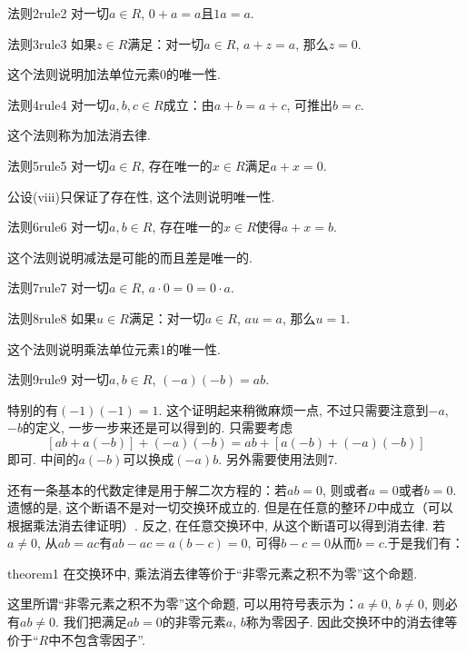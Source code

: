 \begin{corollary}{法则2}{rule2}
对一切$a \in R$, $0+a=a$且$1a=a$. 
\end{corollary}

\begin{corollary}{法则3}{rule3}
如果$z \in R$满足：对一切$a \in R$, $a+z=a$, 那么$z=0$. 
\end{corollary}
这个法则说明加法单位元素0的唯一性. 

\begin{corollary}{法则4}{rule4}
对一切$a, b, c \in R$成立：由$a+b=a+c$, 可推出$b=c$. 
\end{corollary}
这个法则称为加法消去律. 

\begin{corollary}{法则5}{rule5}
对一切$a \in R$, 存在唯一的$x \in R$满足$a+x=0$. 
\end{corollary}
公设(viii)只保证了存在性, 这个法则说明唯一性. 

\begin{corollary}{法则6}{rule6}
对一切$a, b \in R$, 存在唯一的$x \in R$使得$a+x=b$. 
\end{corollary}
这个法则说明减法是可能的而且差是唯一的. 

\begin{corollary}{法则7}{rule7}
对一切$a \in R$, $a \cdot 0 = 0 = 0 \cdot a$. 
\end{corollary}

\begin{corollary}{法则8}{rule8}
如果$u \in R$满足：对一切$a \in R$, $au=a$, 那么$u=1$. 
\end{corollary}
这个法则说明乘法单位元素1的唯一性. 

\begin{corollary}{法则9}{rule9}
对一切$a, b \in R$, $(-a)(-b)=ab$. 
\end{corollary}

特别的有$(-1)(-1)=1$. 这个证明起来稍微麻烦一点, 不过只需要注意到$-a$, $-b$的定义, 一步一步来还是可以得到的. 只需要考虑
\[
[ab + a(-b)] + (-a)(-b) = ab + [a(-b) + (-a)(-b)]
\]
即可. 中间的$a(-b)$可以换成$(-a)b$. 另外需要使用法则7. 

还有一条基本的代数定律是用于解二次方程的：若$ab=0$, 则或者$a=0$或者$b=0$. 遗憾的是, 这个断语不是对一切交换环成立的. 但是在任意的整环$D$中成立（可以根据乘法消去律证明）. 反之, 在任意交换环中, 从这个断语可以得到消去律. 若$a \neq 0$, 从$ab=ac$有$ab-ac=a(b-c)=0$, 可得$b-c=0$从而$b=c$.于是我们有：
\begin{theorem}{}{theorem1}
在交换环中, 乘法消去律等价于“非零元素之积不为零”这个命题. 
\end{theorem}
这里所谓“非零元素之积不为零”这个命题, 可以用符号表示为：$a \neq 0$, $b \neq 0$, 则必有$ab \neq 0$. 我们把满足$ab=0$的非零元素$a$, $b$称为零因子. 因此交换环中的消去律等价于“$R$中不包含零因子”. 

